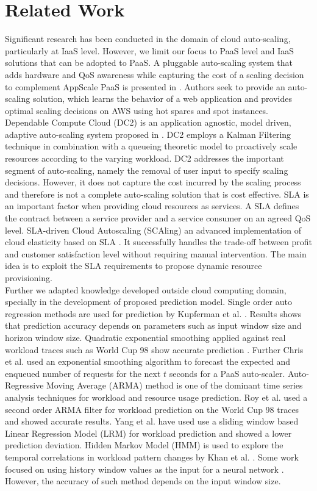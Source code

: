 \section{Related Work}
Significant research has been conducted in the domain of cloud auto-scaling, particularly at IaaS level. However, we limit our focus to PaaS level and IaaS solutions that can be adopted to PaaS. A pluggable auto-scaling system that adds hardware and QoS awareness while capturing the cost of a scaling decision to complement AppScale PaaS is presented in \cite{pluggable}. Authors seek to provide an auto-scaling solution, which learns the behavior of a web application and provides optimal scaling decisions on AWS using hot spares and spot instances. Dependable Compute Cloud (DC2) is an application agnostic, model driven, adaptive auto-scaling system proposed in \cite{modeldriven}. DC2 employs a Kalman Filtering technique in combination with a queueing theoretic model to proactively scale resources according to the varying workload. DC2 addresses the important segment of auto-scaling, namely the removal of user input to specify scaling decisions. However, it does not capture the cost incurred by the scaling process and therefore is not a complete auto-scaling solution that is cost effective. SLA is an important factor when providing cloud resources as services. A SLA defines the contract between a service provider and a service consumer on an agreed QoS level. SLA-driven Cloud Autoscaling (SCAling) an advanced implementation of cloud elasticity based on SLA \cite{sladriven}. It successfully handles the trade-off between profit and customer satisfaction level without requiring manual intervention. The main idea is to exploit the SLA requirements to propose dynamic resource provisioning.\\

Further we adapted knowledge developed outside cloud computing domain, specially in the development of proposed prediction model. Single order auto regression methods are used for prediction by Kupferman et al. \cite{Kupferman_2009}. Results shows that prediction accuracy depends on parameters such as input window size and horizon window size. Quadratic exponential smoothing applied against real workload traces such as World Cup 98 \cite{WorldCup_1998} show accurate prediction \cite{Mi_2010}. Further Chris et al. \cite{Bunch_2012} used an exponential smoothing algorithm to forecast the expected and enqueued number of requests for the next $t$ seconds for a PaaS auto-scaler. Auto-Regressive Moving Average (ARMA) method is one of the dominant time series analysis techniques for workload and resource usage prediction. Roy et al. \cite{Roy_2011} used a second order ARMA filter for workload prediction on the World Cup 98 traces and showed accurate results. Yang et al. \cite{Yang_2013} have used use a sliding window based Linear Regression Model (LRM) for workload prediction and showed a lower prediction deviation. Hidden Markov Model (HMM) is used to explore the temporal correlations in workload pattern changes by Khan et al. \cite{Khan_2012}. Some work focused on using history window values as the input for a neural network \cite{Islam_2012}. However, the accuracy of such method depends on the input window size.\\